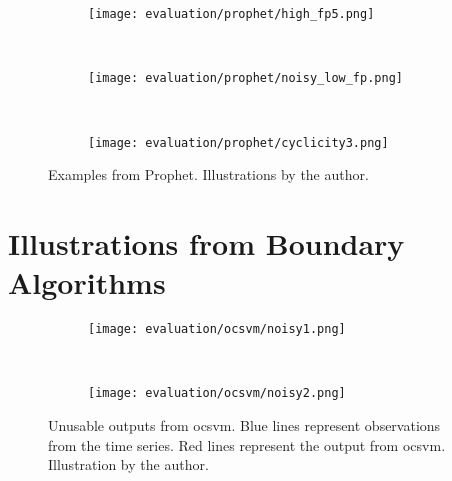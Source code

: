 \begin{figure}[htp!]
    \begin{subfigure}[b]{\linewidth}
        \centering
        \texttt{[image: evaluation/prophet/high\_fp5.png]}
        \label{fig:prophet-fp}
    \end{subfigure}%
    \\
    \begin{subfigure}[b]{\linewidth}
        \centering
        \texttt{[image: evaluation/prophet/noisy\_low\_fp.png]}
        \label{fig:prophet-curvy}
    \end{subfigure}
    \\
    \begin{subfigure}[b]{\linewidth}
        \centering
        \texttt{[image: evaluation/prophet/cyclicity3.png]}
        \label{fig:prophet-cyclicity}
    \end{subfigure}
\caption[Examples from Prophet.]{Examples from Prophet. Illustrations by the author.}\label{fig:prophet-output}
\end{figure}
\clearpage

\section{Illustrations from Boundary Algorithms}

\begin{figure}[htp!]
    \begin{subfigure}[b]{\linewidth}
        \centering
        \texttt{[image: evaluation/ocsvm/noisy1.png]}
    \end{subfigure}%
    \\
    \begin{subfigure}[b]{\linewidth}
        \centering
        \texttt{[image: evaluation/ocsvm/noisy2.png]}
    \end{subfigure}
    \caption[Unusable outputs from \gls{ocsvm}.]{Unusable outputs from \gls{ocsvm}. Blue lines represent observations
    from the time series. Red lines represent the output from \gls{ocsvm}.
    Illustration by the author.}\label{fig:ocsvm-output}
\end{figure}

